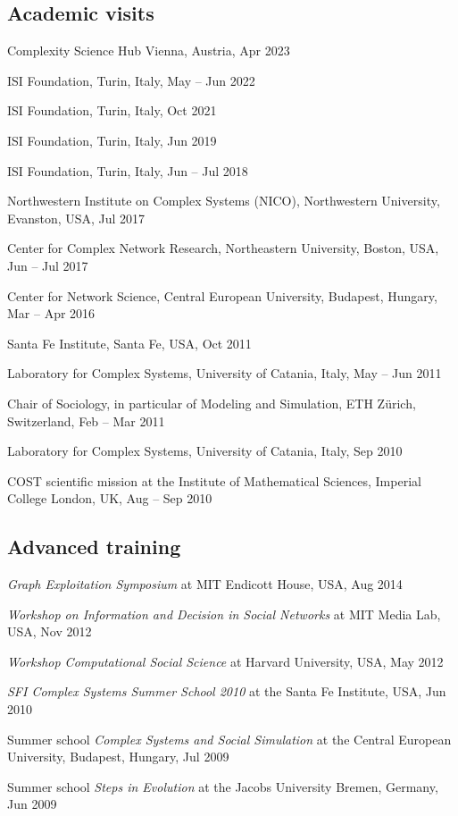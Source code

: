 \documentclass[10pt,a4paper]{article}
\renewenvironment{itemize}{
  \begin{list}{}{
    \setlength{\leftmargin}{1.5em}
    \setlength{\itemsep}{0.25em}
    \setlength{\parskip}{0pt}
    \setlength{\parsep}{0.25em}
  }
}{
  \end{list}
}
\begin{document}
\subsection*{Academic visits}
\begin{itemize}
\item{Complexity Science Hub Vienna, Austria, Apr 2023}
\item{ISI Foundation, Turin, Italy, May -- Jun 2022}
\item{ISI Foundation, Turin, Italy, Oct 2021}
\item{ISI Foundation, Turin, Italy, Jun 2019}
\item{ISI Foundation, Turin, Italy, Jun -- Jul 2018}
\item{Northwestern Institute on Complex Systems (NICO), Northwestern University, Evanston, USA, Jul 2017}
\item{Center for Complex Network Research, Northeastern University, Boston, USA, Jun -- Jul 2017}
\item{Center for Network Science, Central European University, Budapest, Hungary, Mar -- Apr 2016}
\item{Santa Fe Institute, Santa Fe, USA, Oct 2011}
\item{Laboratory for Complex Systems, University of Catania, Italy, May -- Jun 2011}
\item{Chair of Sociology, in particular of Modeling and Simulation, ETH Z{\"u}rich, Switzerland, Feb -- Mar 2011}
\item{Laboratory for Complex Systems, University of Catania, Italy, Sep 2010}
\item{COST scientific mission at the Institute of Mathematical Sciences, Imperial College London, UK, Aug -- Sep 2010}
\end{itemize}

\subsection*{Advanced training}
\begin{itemize}
\item{\emph{Graph Exploitation Symposium} at MIT Endicott House, USA, Aug 2014}
\item{\emph{Workshop on Information and Decision in Social Networks} at MIT Media Lab, USA, Nov 2012}
\item{\emph{Workshop Computational Social Science} at Harvard University, USA, May 2012}
\item{\emph{SFI Complex Systems Summer School 2010} at the Santa Fe Institute, USA, Jun 2010}
\item{Summer school \emph{Complex Systems and Social Simulation} at the Central European University, Budapest, Hungary, Jul 2009}
\item{Summer school \emph{Steps in Evolution} at the Jacobs University Bremen, Germany, Jun 2009}
\end{itemize}
\end{document}
